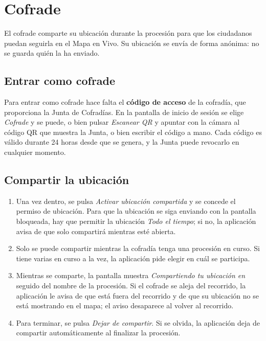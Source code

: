 \section{Cofrade}\label{sec:manualCofrade}

El cofrade comparte su ubicación durante la procesión para que los ciudadanos puedan seguirla en el Mapa en Vivo. Su ubicación se envía de forma anónima: no se guarda quién la ha enviado.

\subsection{Entrar como cofrade}

Para entrar como cofrade hace falta el \textbf{código de acceso} de la cofradía, que proporciona la Junta de Cofradías. En la pantalla de inicio de sesión se elige \emph{Cofrade} y se puede, o bien pulsar \emph{Escanear QR} y apuntar con la cámara al código QR que muestra la Junta, o bien escribir el código a mano. Cada código es válido durante 24 horas desde que se genera, y la Junta puede revocarlo en cualquier momento.

\subsection{Compartir la ubicación}

\begin{enumerate}
    \item Una vez dentro, se pulsa \emph{Activar ubicación compartida} y se concede el permiso de ubicación. Para que la ubicación se siga enviando con la pantalla bloqueada, hay que permitir la ubicación \emph{Todo el tiempo}; si no, la aplicación avisa de que solo compartirá mientras esté abierta.
    \item Solo se puede compartir mientras la cofradía tenga una procesión en curso. Si tiene varias en curso a la vez, la aplicación pide elegir en cuál se participa.
    \item Mientras se comparte, la pantalla muestra \emph{Compartiendo tu ubicación en} seguido del nombre de la procesión. Si el cofrade se aleja del recorrido, la aplicación le avisa de que está fuera del recorrido y de que su ubicación no se está mostrando en el mapa; el aviso desaparece al volver al recorrido.
    \item Para terminar, se pulsa \emph{Dejar de compartir}. Si se olvida, la aplicación deja de compartir automáticamente al finalizar la procesión.
\end{enumerate}

